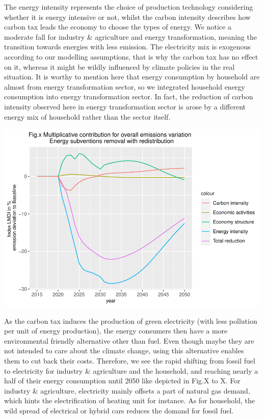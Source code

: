 \documentclass[
]{article}
\begin{document}
The energy intensity represents the choice of production technology
considering whether it is energy intensive or not, whilst the carbon
intensity describes how carbon tax leads the economy to choose the types
of energy. We notice a moderate fall for industry \& agriculture and
energy transformation, meaning the transition towards energies with less
emission. The electricity mix is exogenous according to our modelling
assumptions, that is why the carbon tax has no effect on it, whereas it
might be wildly influenced by climate policies in the real situation. It
is worthy to mention here that energy consumption by household are
almost from energy transformation sector, so we integrated household
energy consumption into energy transformation sector. In fact, the
reduction of carbon intensity observed here in energy transformation
sector is arose by a different energy mix of household rather than the
sector itself.

\includegraphics{Modele-ThreeMe-Tunisie_Sequeira_Valilou_Wang_files/figure-latex/unnamed-chunk-27-1.pdf}

As the carbon tax induces the production of green electricity (with less
pollution per unit of energy production), the energy consumers then have
a more environmental friendly alternative other than fuel. Even though
maybe they are not intended to care about the climate change, using this
alternative enables them to cut back their costs. Therefore, we see the
rapid shifting from fossil fuel to electricity for industry \&
agriculture and the household, and reaching nearly a half of their
energy consumption until 2050 like depicted in Fig.X to X. For industry
\& agriculture, electricity mainly offsets a part of natural gas demand,
which hints the electrification of heating unit for instance. As for
household, the wild spread of electrical or hybrid cars reduces the
domand for fossil fuel.
\end{document}
